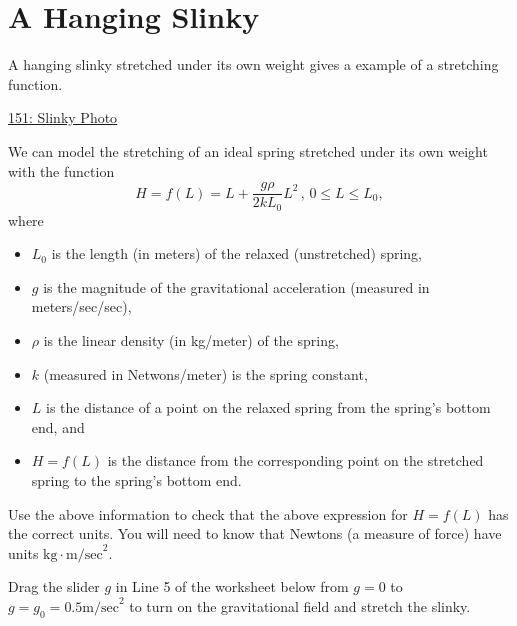 \documentclass{ximera}
\begin{document}
\section{A Hanging Slinky}
\begin{example} \label{Ex:MDH4955gfg}
A hanging slinky stretched under its own weight gives a example of a stretching function. 


\begin{onlineOnly}
    \begin{center}
\end{center}
\end{onlineOnly}

\href{https://www.desmos.com/calculator/zqjjgael5j}{151: Slinky Photo}

We can model the stretching of an ideal spring stretched under its own weight with the function
\[
 H = f(L) = L + \frac{g\rho}{2kL_0}L^2 \, , \, 0\leq L \leq L_0 ,
\]
where
\begin{itemize}
\item $L_0$ is the length (in meters) of the relaxed (unstretched) spring, 

\item $g$ is the magnitude of the gravitational acceleration (measured in meters/sec/sec),

\item $\rho$ is the linear density (in kg/meter) of the spring,

\item $k$ (measured in Netwons/meter) is the spring constant,

\item $L$ is the distance of a point on the relaxed spring from the spring's bottom end, and

\item $H=f(L)$ is the distance from the corresponding point on the stretched spring to the spring's bottom end.

\end{itemize}

\begin{freeResponse}
Use the above information to check that the above expression for $H=f(L)$ has the correct units. You will need to know that Newtons (a measure of force) have units $\text{kg}\cdot \text{m/sec}^2$. 
\end{freeResponse}



Drag the slider $g$ in Line 5 of the worksheet below from $g=0$ to $g=g_0 = 0.5 \text{m/sec}^2$ to turn on the gravitational field and stretch the slinky. 


\end{example}
\end{document}
